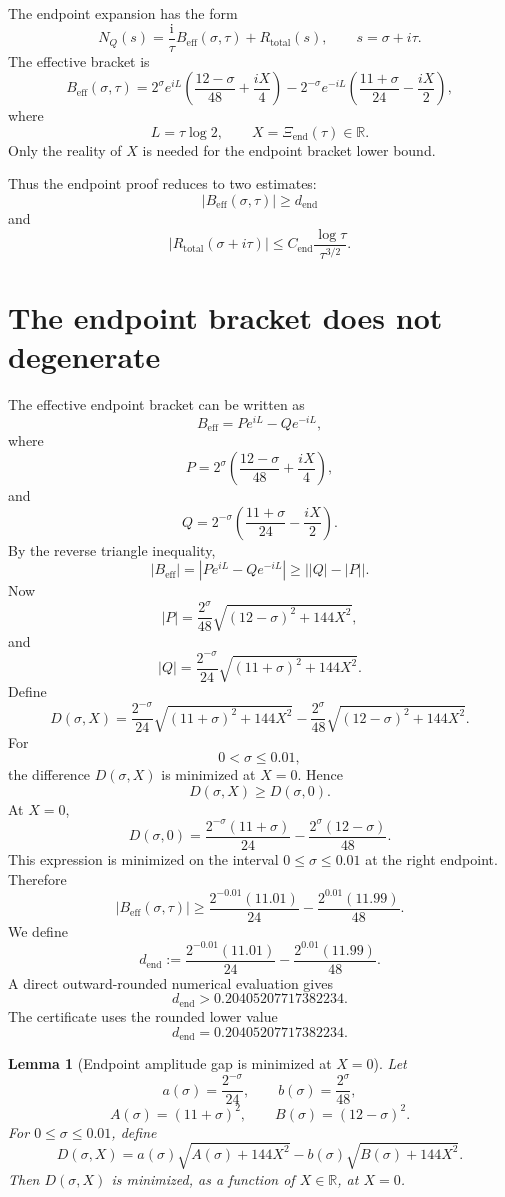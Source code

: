 \documentclass[11pt]{article}
\newtheorem{lemma}[theorem]{Lemma}
\newcommand{\NQ}{N_Q}
\newcommand{\Beff}{B_{\mathrm{eff}}}
\newcommand{\Rtot}{R_{\mathrm{total}}}
\newcommand{\Cend}{C_{\mathrm{end}}}
\newcommand{\dend}{d_{\mathrm{end}}}
\newcommand{\ii}{\mathrm{i}}
\begin{document}
The endpoint expansion has the form
\[
\NQ(s)=\frac{\ii}{\tau}\Beff(\sigma,\tau)+\Rtot(s),
\qquad
s=\sigma+i\tau.
\]
The effective bracket is
\[
\Beff(\sigma,\tau)
=
2^\sigma e^{iL}
\left(
\frac{12-\sigma}{48}
+
\frac{iX}{4}
\right)
-
2^{-\sigma}e^{-iL}
\left(
\frac{11+\sigma}{24}
-
\frac{iX}{2}
\right),
\]
where
\[
L=\tau\log 2,
\qquad
X=\Xi_{\mathrm{end}}(\tau)\in\mathbb{R}.
\]
Only the reality of \(X\) is needed for the endpoint bracket lower bound.

Thus the endpoint proof reduces to two estimates:
\[
|\Beff(\sigma,\tau)|\geq \dend
\]
and
\[
|\Rtot(\sigma+i\tau)|
\leq
\Cend\frac{\log\tau}{\tau^{3/2}}.
\]

\section{The endpoint bracket does not degenerate}

The effective endpoint bracket can be written as
\[
\Beff=P e^{iL}-Qe^{-iL},
\]
where
\[
P
=
2^\sigma
\left(
\frac{12-\sigma}{48}
+
\frac{iX}{4}
\right),
\]
and
\[
Q
=
2^{-\sigma}
\left(
\frac{11+\sigma}{24}
-
\frac{iX}{2}
\right).
\]
By the reverse triangle inequality,
\[
|\Beff|
=
|P e^{iL}-Qe^{-iL}|
\geq
\bigl||Q|-|P|\bigr|.
\]
Now
\[
|P|
=
\frac{2^\sigma}{48}
\sqrt{(12-\sigma)^2+144X^2},
\]
and
\[
|Q|
=
\frac{2^{-\sigma}}{24}
\sqrt{(11+\sigma)^2+144X^2}.
\]
Define
\[
D(\sigma,X)
=
\frac{2^{-\sigma}}{24}
\sqrt{(11+\sigma)^2+144X^2}
-
\frac{2^\sigma}{48}
\sqrt{(12-\sigma)^2+144X^2}.
\]
For
\[
0< \sigma\leq 0.01,
\]
the difference \(D(\sigma,X)\) is minimized at \(X=0\).  Hence
\[
D(\sigma,X)\geq D(\sigma,0).
\]
At \(X=0\),
\[
D(\sigma,0)
=
\frac{2^{-\sigma}(11+\sigma)}{24}
-
\frac{2^\sigma(12-\sigma)}{48}.
\]
This expression is minimized on the interval \(0\leq \sigma\leq0.01\) at the right endpoint.  Therefore
\[
|\Beff(\sigma,\tau)|
\geq
\frac{2^{-0.01}(11.01)}{24}
-
\frac{2^{0.01}(11.99)}{48}.
\]
We define
\[
\dend
:=
\frac{2^{-0.01}(11.01)}{24}
-
\frac{2^{0.01}(11.99)}{48}.
\]
A direct outward-rounded numerical evaluation gives
\[
\dend>0.20405207717382234.
\]
The certificate uses the rounded lower value
\[
\dend=0.20405207717382234.
\]


\begin{lemma}[Endpoint amplitude gap is minimized at \(X=0\)]
Let
\[
a(\sigma)=\frac{2^{-\sigma}}{24},
\qquad
b(\sigma)=\frac{2^\sigma}{48},
\]
\[
A(\sigma)=(11+\sigma)^2,
\qquad
B(\sigma)=(12-\sigma)^2.
\]
For \(0\le\sigma\le0.01\), define
\[
D(\sigma,X)
=
a(\sigma)\sqrt{A(\sigma)+144X^2}
-
b(\sigma)\sqrt{B(\sigma)+144X^2}.
\]
Then \(D(\sigma,X)\) is minimized, as a function of \(X\in\mathbb R\), at
\(X=0\).
\end{lemma}
\end{document}
